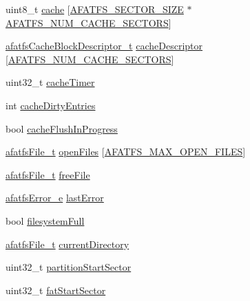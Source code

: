 \begin{DoxyCompactItemize}
\begin{tabbing}
\end{tabbing}\item 
uint8\+\_\+t \hyperlink{structafatfs__t_aae478dc8b7a6eee13442e3da698699cb}{cache} \mbox{[}\hyperlink{asyncfatfs_8c_a3b512c1a9ba63f4aa588ce8c5c36e5e1}{A\+F\+A\+T\+F\+S\+\_\+\+S\+E\+C\+T\+O\+R\+\_\+\+S\+I\+Z\+E} $\ast$\hyperlink{asyncfatfs_8c_a0013c2197300b548f869a7cea6376424}{A\+F\+A\+T\+F\+S\+\_\+\+N\+U\+M\+\_\+\+C\+A\+C\+H\+E\+\_\+\+S\+E\+C\+T\+O\+R\+S}\mbox{]}
\item 
\hyperlink{structafatfsCacheBlockDescriptor__t}{afatfs\+Cache\+Block\+Descriptor\+\_\+t} \hyperlink{structafatfs__t_a79d527dd25222c814459251af9ebd44a}{cache\+Descriptor} \mbox{[}\hyperlink{asyncfatfs_8c_a0013c2197300b548f869a7cea6376424}{A\+F\+A\+T\+F\+S\+\_\+\+N\+U\+M\+\_\+\+C\+A\+C\+H\+E\+\_\+\+S\+E\+C\+T\+O\+R\+S}\mbox{]}
\item 
uint32\+\_\+t \hyperlink{structafatfs__t_ac76866f17a0f58d6775287989e677080}{cache\+Timer}
\item 
int \hyperlink{structafatfs__t_a5afafb50df543f56c85b53d2b3aec282}{cache\+Dirty\+Entries}
\item 
bool \hyperlink{structafatfs__t_a6ce47c9b615dd0e1ee5716bdec516955}{cache\+Flush\+In\+Progress}
\item 
\hyperlink{structafatfsFile__t}{afatfs\+File\+\_\+t} \hyperlink{structafatfs__t_a75322bb76641e102ee19d7e805742a57}{open\+Files} \mbox{[}\hyperlink{asyncfatfs_8c_ab12838e2b7deaa29276fd4282324e7b7}{A\+F\+A\+T\+F\+S\+\_\+\+M\+A\+X\+\_\+\+O\+P\+E\+N\+\_\+\+F\+I\+L\+E\+S}\mbox{]}
\item 
\hyperlink{structafatfsFile__t}{afatfs\+File\+\_\+t} \hyperlink{structafatfs__t_a6202c43fd2114081ef640f1de4289fe6}{free\+File}
\item 
\hyperlink{asyncfatfs_8h_a1d1a5caba1d47f562f384013c3efa2df}{afatfs\+Error\+\_\+e} \hyperlink{structafatfs__t_a29155f6a40ff7e59b17eaccd00d8ebd6}{last\+Error}
\item 
bool \hyperlink{structafatfs__t_a0016168f0d9acb24f1e7933eb5eb7ac3}{filesystem\+Full}
\item 
\hyperlink{structafatfsFile__t}{afatfs\+File\+\_\+t} \hyperlink{structafatfs__t_aab8c9692ba408252c5b745f83633cd1f}{current\+Directory}
\item 
uint32\+\_\+t \hyperlink{structafatfs__t_ae4b82813964e5cbd736e920eecde4c7f}{partition\+Start\+Sector}
\item 
uint32\+\_\+t \hyperlink{structafatfs__t_a59ddc420b3af0df15421843eb5a23c9c}{fat\+Start\+Sector}
\item 

\end{DoxyCompactItemize}
